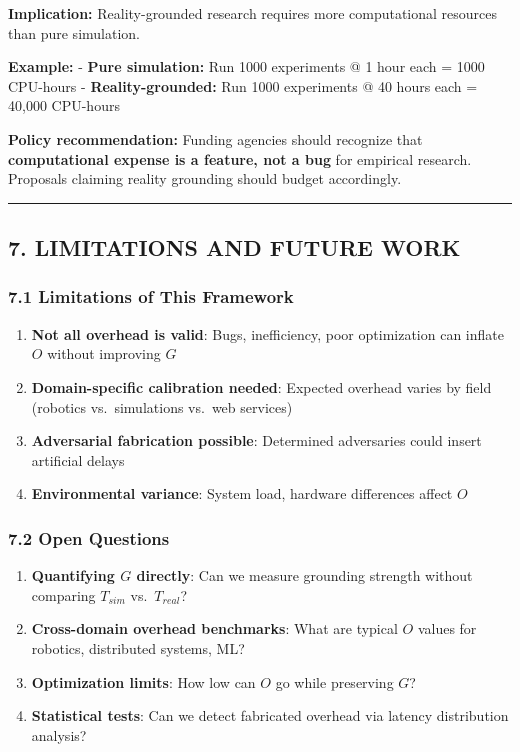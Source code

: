 \documentclass[
]{article}
\providecommand{\tightlist}{%
  \setlength{\itemsep}{0pt}\setlength{\parskip}{0pt}}
\begin{document}
\textbf{Implication:} Reality-grounded research requires more
computational resources than pure simulation.

\textbf{Example:} - \textbf{Pure simulation:} Run 1000 experiments @ 1
hour each = 1000 CPU-hours - \textbf{Reality-grounded:} Run 1000
experiments @ 40 hours each = 40,000 CPU-hours

\textbf{Policy recommendation:} Funding agencies should recognize that
\textbf{computational expense is a feature, not a bug} for empirical
research. Proposals claiming reality grounding should budget
accordingly.

\begin{center}\rule{0.5\linewidth}{0.5pt}\end{center}

\subsection{7. LIMITATIONS AND FUTURE
WORK}\label{limitations-and-future-work}

\subsubsection{7.1 Limitations of This
Framework}\label{limitations-of-this-framework}

\begin{enumerate}
\def\labelenumi{\arabic{enumi}.}
\tightlist
\item
  \textbf{Not all overhead is valid}: Bugs, inefficiency, poor
  optimization can inflate \(O\) without improving \(G\)
\item
  \textbf{Domain-specific calibration needed}: Expected overhead varies
  by field (robotics vs.~simulations vs.~web services)
\item
  \textbf{Adversarial fabrication possible}: Determined adversaries
  could insert artificial delays
\item
  \textbf{Environmental variance}: System load, hardware differences
  affect \(O\)
\end{enumerate}

\subsubsection{7.2 Open Questions}\label{open-questions}

\begin{enumerate}
\def\labelenumi{\arabic{enumi}.}
\tightlist
\item
  \textbf{Quantifying \(G\) directly}: Can we measure grounding strength
  without comparing \(T_{sim}\) vs.~\(T_{real}\)?
\item
  \textbf{Cross-domain overhead benchmarks}: What are typical \(O\)
  values for robotics, distributed systems, ML?
\item
  \textbf{Optimization limits}: How low can \(O\) go while preserving
  \(G\)?
\item
  \textbf{Statistical tests}: Can we detect fabricated overhead via
  latency distribution analysis?
\end{enumerate}
\end{document}
